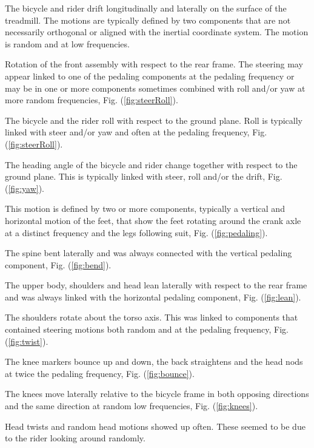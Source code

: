 \begin{description}[Pedaling]
    \item[Drift] The bicycle and rider drift longitudinally and laterally on
        the surface of the treadmill. The motions are typically defined by two
        components that are not necessarily orthogonal or aligned with the
        inertial coordinate system. The motion is random and at low
        frequencies.
    \item[Steer] Rotation of the front assembly with respect to the rear frame.
        The steering may appear linked to one of the pedaling components at the
        pedaling frequency or may be in one or more components sometimes
        combined with roll and/or yaw at more random frequencies, Fig.
        (\ref{fig:steerRoll}).
    \item[Roll] The bicycle and the rider roll with respect to the ground
        plane. Roll is typically linked with steer and/or yaw and often at the
        pedaling frequency, Fig. (\ref{fig:steerRoll}).
    \item[Yaw] The heading angle of the bicycle and rider change together with
        respect to the ground plane. This is typically linked with steer, roll
        and/or the drift, Fig. (\ref{fig:yaw}).
    \item[Pedaling] This motion is defined by two or more components, typically
        a vertical and horizontal motion of the feet, that show the feet
        rotating around the crank axle at a distinct frequency and the legs
        following suit, Fig. (\ref{fig:pedaling}).
    \item[Bend] The spine bent laterally and was always connected with the
        vertical pedaling component, Fig. (\ref{fig:bend}).
    \item[Lean] The upper body, shoulders and head lean laterally with respect
        to the rear frame and was always linked with the horizontal pedaling
        component, Fig. (\ref{fig:lean}).
    \item[Twist] The shoulders rotate about the torso axis. This was linked to
        components that contained steering motions both random and at the
        pedaling frequency, Fig. (\ref{fig:twist}).
    \item[Bounce] The knee markers bounce up and down, the back straightens and
        the head nods at twice the pedaling frequency, Fig.
        (\ref{fig:bounce}).
    \item[Knees] The knees move laterally relative to the bicycle frame in both
        opposing directions and the same direction at random low frequencies,
        Fig. (\ref{fig:knees}).
    \item[Head] Head twists and random head motions showed up often. These
        seemed to be due to the rider looking around randomly.
\end{description}
